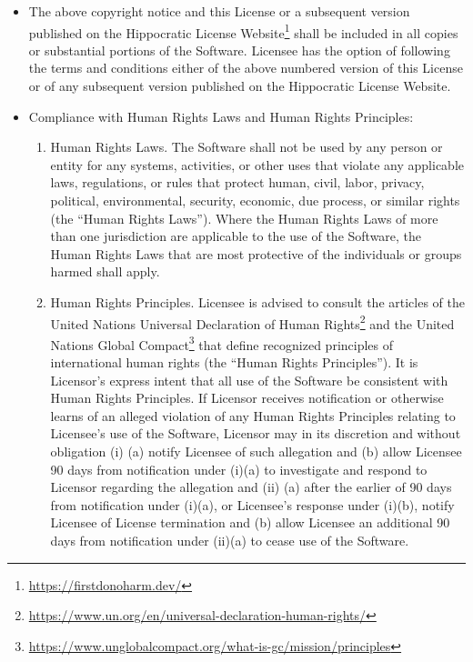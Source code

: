 \documentclass[krantzl]{krantz}
\newcommand{\hreffoot}[2]{{#1}\footnote{\href{#2}{#2}}}
\begin{document}
\begin{itemize}
\item 

The above copyright notice and this License or a subsequent version published
    on the \hreffoot{Hippocratic License Website}{https://firstdonoharm.dev/} shall be
    included in all copies or substantial portions of the Software. Licensee has
    the option of following the terms and conditions either of the above
    numbered version of this License or of any subsequent version published on
    the Hippocratic License Website.



\item 

Compliance with Human Rights Laws and Human Rights Principles:

\begin{enumerate}
\item 

Human Rights Laws. The Software shall not be used by any person or
    entity for any systems, activities, or other uses that violate any
    applicable laws, regulations, or rules that protect human, civil, labor,
    privacy, political, environmental, security, economic, due process, or
    similar rights (the “Human Rights Laws”). Where the Human Rights Laws of
    more than one jurisdiction are applicable to the use of the Software,
    the Human Rights Laws that are most protective of the individuals or
    groups harmed shall apply.



\item 

Human Rights Principles. Licensee is advised to consult the articles of
    the \hreffoot{United Nations Universal Declaration of Human Rights}{https://www.un.org/en/universal-declaration-human-rights/} and the
    \hreffoot{United Nations Global Compact}{https://www.unglobalcompact.org/what-is-gc/mission/principles} that define recognized principles
    of international human rights (the “Human Rights Principles”). It is
    Licensor’s express intent that all use of the Software be consistent
    with Human Rights Principles. If Licensor receives notification or
    otherwise learns of an alleged violation of any Human Rights Principles
    relating to Licensee’s use of the Software, Licensor may in its
    discretion and without obligation (i) (a) notify Licensee of such
    allegation and (b) allow Licensee 90 days from notification under (i)(a)
    to investigate and respond to Licensor regarding the allegation and (ii)
    (a) after the earlier of 90 days from notification under (i)(a), or
    Licensee’s response under (i)(b), notify Licensee of License termination
    and (b) allow Licensee an additional 90 days from notification under
    (ii)(a) to cease use of the Software.




\end{enumerate}
\end{itemize}
\end{document}
